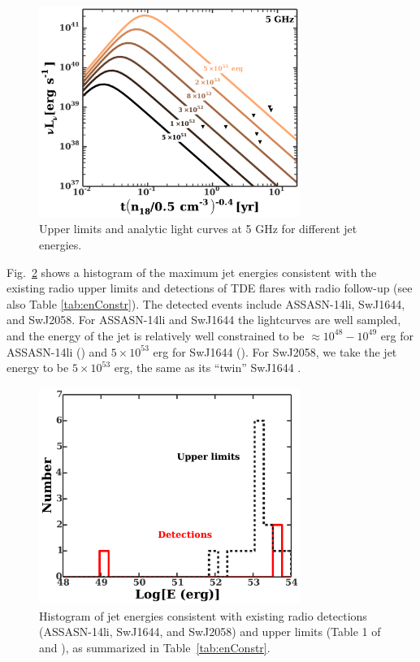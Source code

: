 \documentclass[usenatbib,fleqn]{mnras}
\begin{document}
\begin{figure}
\includegraphics[width=8.5cm]{e_contours1.pdf}
\caption{\label{fig:econtours} Upper limits and analytic
  light curves at 5 GHz for different jet energies.}
\end{figure}

Fig.~\ref{fig:hist} shows a histogram of the maximum jet energies
consistent with the existing radio upper limits and detections of TDE
flares with radio follow-up (see also Table \ref{tab:enConstr}).  The
detected events include ASSASN-14li, SwJ1644, and SwJ2058.  For
ASSASN-14li and SwJ1644 the lightcurves are well sampled, and the
energy of the jet is relatively well constrained to be $\approx
10^{48}-10^{49}$ erg for ASSASN-14li (\citealt{van-Velzen+2015,
  Alexander+2015}) and $5\times 10^{53}$ erg for SwJ1644
(\citealt{Mimica+2015}).  For SwJ2058, we take the jet energy to be
$5\times 10^{53}$ erg, the same as its ``twin'' SwJ1644 \citep{Cenko+2012,Pasham+2015}.


\begin{figure}
\includegraphics[width=8.5cm]{hist.pdf}
\caption{\label{fig:hist} Histogram of jet energies consistent with
  existing radio detections (ASSASN-14li,  SwJ1644, and
  SwJ2058) and upper limits (Table 1 of \citealt{Mimica+2015} and
  \citealt{Arcavi+2014}), as summarized in Table~\ref{tab:enConstr}.}
\end{figure}
\end{document}
